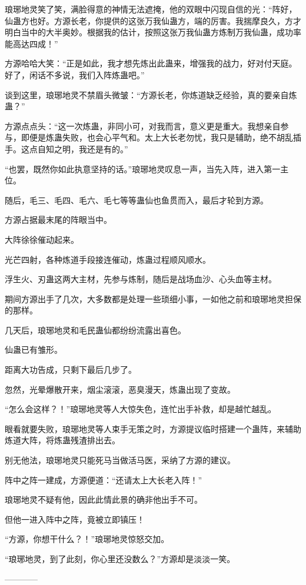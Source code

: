 \begin{this_body}
琅琊地灵笑了笑，满脸得意的神情无法遮掩，他的双眼中闪现自信的光：“阵好，仙蛊方也好。方源长老，你提供的这张万我仙蛊方，端的厉害。我揣摩良久，方才明白当中的大半奥妙。根据我的估计，按照这张万我仙蛊方炼制万我仙蛊，成功率能高达四成！”

方源哈哈大笑：“正是如此，我才想先炼出此蛊来，增强我的战力，好对付天庭。好了，闲话不多说，我们入阵炼蛊吧。”

谈到这里，琅琊地灵不禁眉头微皱：“方源长老，你炼道缺乏经验，真的要亲自炼蛊？”

方源点点头：“这一次炼蛊，非同小可，对我而言，意义更是重大。我想亲自参与，即便是炼蛊失败，也会心平气和。太上大长老勿忧，我只是辅助，绝不胡乱插手。这点自知之明，我还是有的。”

“也罢，既然你如此执意坚持的话。”琅琊地灵叹息一声，当先入阵，进入第一主位。

随后，毛三、毛四、毛六、毛七等等蛊仙也鱼贯而入，最后才轮到方源。

方源占据最末尾的阵眼当中。

大阵徐徐催动起来。

光芒四射，各种炼道手段接连催动，炼蛊过程顺风顺水。

浮生火、刃蛊这两大主材，先参与炼制，随后是战场血沙、心头血等主材。

期间方源出手了几次，大多数都是处理一些琐细小事，一如他之前和琅琊地灵担保的那样。

几天后，琅琊地灵和毛民蛊仙都纷纷流露出喜色。

仙蛊已有雏形。

距离大功告成，只剩下最后几步了。

忽然，光晕爆散开来，烟尘滚滚，恶臭漫天，炼蛊出现了变故。

“怎么会这样？！”琅琊地灵等人大惊失色，连忙出手补救，却是越忙越乱。

眼看就要失败，琅琊地灵等人束手无策之时，方源提议临时搭建一个蛊阵，来辅助炼道大阵，将炼蛊残渣排出去。

别无他法，琅琊地灵只能死马当做活马医，采纳了方源的建议。

阵中之阵一建成，方源便道：“还请太上大长老入阵！”

琅琊地灵不疑有他，因此此情此景的确非他出手不可。

但他一进入阵中之阵，竟被立即镇压！

“方源，你想干什么？！”琅琊地灵惊怒交加。

“琅琊地灵，到了此刻，你心里还没数么？”方源却是淡淡一笑。

------------

\end{this_body}

